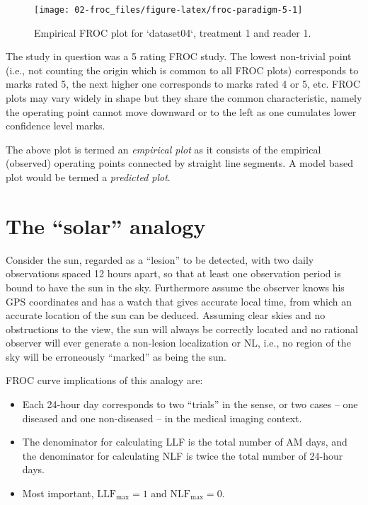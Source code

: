 \documentclass[
]{book}
\providecommand{\tightlist}{%
  \setlength{\itemsep}{0pt}\setlength{\parskip}{0pt}}
\begin{document}
\begin{figure}

{\centering \texttt{[image: 02-froc\_files/figure-latex/froc-paradigm-5-1]} 

}

\caption{Empirical FROC plot for `dataset04`, treatment 1 and reader 1.}\label{fig:froc-paradigm-5}
\end{figure}

The study in question was a 5 rating FROC study. The lowest non-trivial point (i.e., not counting the origin which is common to all FROC plots) corresponds to marks rated 5, the next higher one corresponds to marks rated 4 or 5, etc. FROC plots may vary widely in shape but they share the common characteristic, namely the operating point cannot move downward or to the left as one cumulates lower confidence level marks.

The above plot is termed an \emph{empirical plot} as it consists of the empirical (observed) operating points connected by straight line segments. A model based plot would be termed a \emph{predicted plot}.

\hypertarget{froc-paradigm-solar-analogy}{%
\section{The ``solar'' analogy}\label{froc-paradigm-solar-analogy}}

Consider the sun, regarded as a ``lesion'' to be detected, with two daily observations spaced 12 hours apart, so that at least one observation period is bound to have the sun in the sky. Furthermore assume the observer knows his GPS coordinates and has a watch that gives accurate local time, from which an accurate location of the sun can be deduced. Assuming clear skies and no obstructions to the view, the sun will always be correctly located and no rational observer will ever generate a non-lesion localization or NL, i.e., no region of the sky will be erroneously ``marked'' as being the sun.

FROC curve implications of this analogy are:

\begin{itemize}
\tightlist
\item
  Each 24-hour day corresponds to two ``trials'' in the \citep{egan1961operating} sense, or two cases -- one diseased and one non-diseased -- in the medical imaging context.
\item
  The denominator for calculating LLF is the total number of AM days, and the denominator for calculating NLF is twice the total number of 24-hour days.
\item
  Most important, \(\text{LLF}_{\text{max}} = 1\) and \(\text{NLF}_{\text{max}} = 0\).
\end{itemize}
\end{document}
